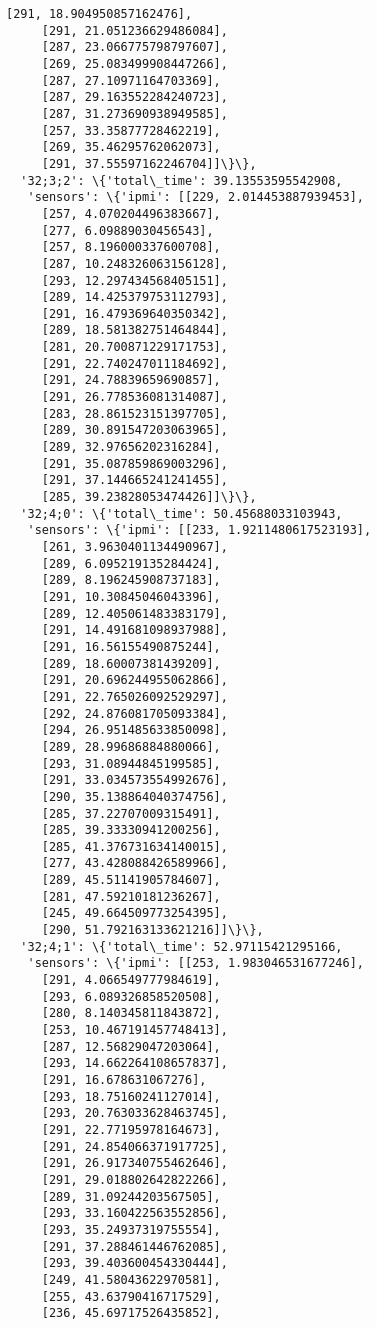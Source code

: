 \documentclass[11pt]{article}
\begin{document}
\begin{tcolorbox}[breakable, size=fbox, boxrule=.5pt, pad at break*=1mm, opacityfill=0]
\begin{Verbatim}[commandchars=\\\{\}]
     [291, 18.904950857162476],
     [291, 21.051236629486084],
     [287, 23.066775798797607],
     [269, 25.083499908447266],
     [287, 27.10971164703369],
     [287, 29.163552284240723],
     [287, 31.273690938949585],
     [257, 33.35877728462219],
     [269, 35.46295762062073],
     [291, 37.55597162246704]]\}\},
  '32;3;2': \{'total\_time': 39.13553595542908,
   'sensors': \{'ipmi': [[229, 2.014453887939453],
     [257, 4.070204496383667],
     [277, 6.09889030456543],
     [257, 8.196000337600708],
     [287, 10.248326063156128],
     [293, 12.297434568405151],
     [289, 14.425379753112793],
     [291, 16.479369640350342],
     [289, 18.581382751464844],
     [281, 20.700871229171753],
     [291, 22.740247011184692],
     [291, 24.78839659690857],
     [291, 26.778536081314087],
     [283, 28.861523151397705],
     [289, 30.891547203063965],
     [289, 32.97656202316284],
     [291, 35.087859869003296],
     [291, 37.144665241241455],
     [285, 39.23828053474426]]\}\},
  '32;4;0': \{'total\_time': 50.45688033103943,
   'sensors': \{'ipmi': [[233, 1.9211480617523193],
     [261, 3.9630401134490967],
     [289, 6.095219135284424],
     [289, 8.196245908737183],
     [291, 10.30845046043396],
     [289, 12.405061483383179],
     [291, 14.491681098937988],
     [291, 16.56155490875244],
     [289, 18.60007381439209],
     [291, 20.696244955062866],
     [291, 22.765026092529297],
     [292, 24.876081705093384],
     [294, 26.951485633850098],
     [289, 28.99686884880066],
     [293, 31.08944845199585],
     [291, 33.034573554992676],
     [290, 35.138864040374756],
     [285, 37.22707009315491],
     [285, 39.33330941200256],
     [285, 41.376731634140015],
     [277, 43.428088426589966],
     [289, 45.51141905784607],
     [281, 47.59210181236267],
     [245, 49.664509773254395],
     [290, 51.792163133621216]]\}\},
  '32;4;1': \{'total\_time': 52.97115421295166,
   'sensors': \{'ipmi': [[253, 1.983046531677246],
     [291, 4.066549777984619],
     [293, 6.089326858520508],
     [280, 8.140345811843872],
     [253, 10.467191457748413],
     [287, 12.56829047203064],
     [293, 14.662264108657837],
     [291, 16.678631067276],
     [293, 18.75160241127014],
     [293, 20.763033628463745],
     [291, 22.77195978164673],
     [291, 24.854066371917725],
     [291, 26.917340755462646],
     [291, 29.018802642822266],
     [289, 31.09244203567505],
     [293, 33.160422563552856],
     [293, 35.24937319755554],
     [291, 37.288461446762085],
     [293, 39.403600454330444],
     [249, 41.58043622970581],
     [255, 43.63790416717529],
     [236, 45.69717526435852],

\end{Verbatim}
\end{tcolorbox}
\end{document}
